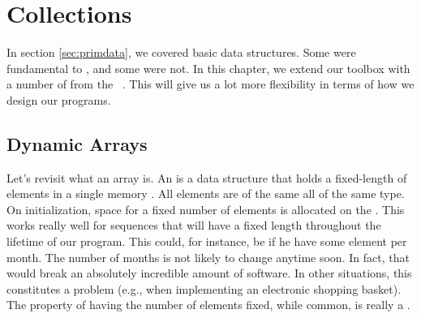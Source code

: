 \chapter{Collections}
\label{collections}

In section \ref{sec:primdata}, we covered basic data structures. Some were fundamental to \csharp, and some were not. In this chapter, we extend our toolbox with a number of  from the \csharp\ . This will give us a lot more flexibility in terms of how we design our programs.

\section{Dynamic Arrays}


Let's revisit what an array is. An  is a data structure that holds a fixed-length  of elements in a single memory . All elements are of the same all of the same type. On initialization, space for a fixed number of elements is allocated on the . This works really well for sequences that will have a fixed length throughout the lifetime of our program. This could, for instance, be if he have some element per month. The number of months is not likely to change anytime soon. In fact, that would break an absolutely incredible amount of software. In other situations, this constitutes a problem (e.g., when implementing an electronic shopping basket). The property of having the number of elements fixed, while common, is really a .

